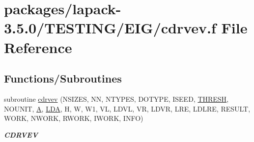 \hypertarget{cdrvev_8f}{}\section{packages/lapack-\/3.5.0/\+T\+E\+S\+T\+I\+N\+G/\+E\+I\+G/cdrvev.f File Reference}
\label{cdrvev_8f}
\subsection*{Functions/\+Subroutines}
\begin{DoxyCompactItemize}
\item 
subroutine \hyperlink{group__complex__eig_ga83586dc59c82790361b0de5fe25bf0f3}{cdrvev} (N\+S\+I\+Z\+E\+S, N\+N, N\+T\+Y\+P\+E\+S, D\+O\+T\+Y\+P\+E, I\+S\+E\+E\+D, \hyperlink{zlaqgs_8c_a0656018abfc9fa2821827415f5d5ea57}{T\+H\+R\+E\+S\+H}, N\+O\+U\+N\+I\+T, \hyperlink{classA}{A}, \hyperlink{example__user_8c_ae946da542ce0db94dced19b2ecefd1aa}{L\+D\+A}, H, W, W1, V\+L, L\+D\+V\+L, V\+R, L\+D\+V\+R, L\+R\+E, L\+D\+L\+R\+E, R\+E\+S\+U\+L\+T, W\+O\+R\+K, N\+W\+O\+R\+K, R\+W\+O\+R\+K, I\+W\+O\+R\+K, I\+N\+F\+O)
\begin{DoxyCompactList}\small\item\em {\bfseries C\+D\+R\+V\+E\+V} \end{DoxyCompactList}\end{DoxyCompactItemize}
